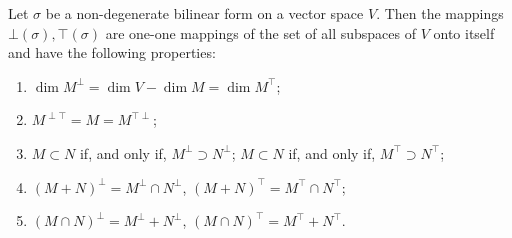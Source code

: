 Let $\sigma$ be a non-degenerate bilinear form on a vector space $V$. Then the mappings $\bot(\sigma), \top(\sigma)$ are one-one mappings of the set of all subspaces of $V$ onto itself and have the following properties:

\begin{enumerate}
\item $\dim M^{\perp} = \dim V - \dim M = \dim M^{\top}$;
\item $M^{\perp \top} = M = M^{\top \perp}$;
\item $M \subset N$ if, and only if, $M^{\perp} \supset N^{\perp}$; $M \subset N$ if, and only if, $M^{\top} \supset N^{\top}$;
\item $(M + N)^{\perp} = M^{\perp} \cap N^{\perp}$, \quad $(M + N)^{\top} = M^{\top} \cap N^{\top}$;
\item $(M \cap N)^{\perp} = M^{\perp} + N^{\perp}$, \quad $(M \cap N)^{\top} = M^{\top} + N^{\top}$.
\end{enumerate}
